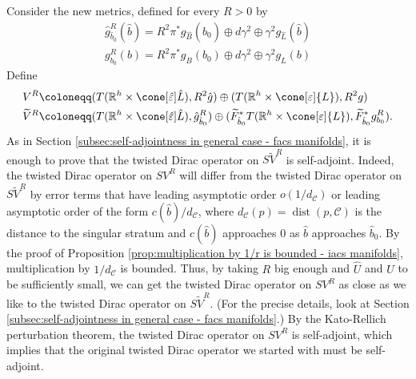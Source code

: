 \documentclass[12pt, reqno]{amsart}
\theoremstyle{plain} %
\theoremstyle{definition}
\theoremstyle{remark}
\numberwithin{equation}{section}
\newcommand{\dom}[1]{\hat{#1}}
\newcommand{\cat}[1]{\mathcal{#1}}
\newcommand{\field}[1]{\mathbb{#1}}
\newcommand{\R}{\field{R}}
\newcommand{\hdim}{h} %
\DeclareMathOperator{\dist}{dist}
\begin{document}
Consider the new metrics, defined for every \(R > 0\) by
\begin{gather*}
    \dom{g}_{\dom{b}_0}^R(\dom{b}) = R^2 \pi^*g_{\dom{B}}(\dom{b}_0) \oplus d\gamma^2 \oplus \gamma^2 g_{\dom{L}}(\dom{b}) \\
    g_{b_0}^R(b) = R^2 \pi^*g_B(b_0) \oplus d\gamma^2 \oplus \gamma^2 g_L(b)
\end{gather*}
Define
\begin{align*}
    V^R &\coloneqq (T(\R^\hdim \times \cone[\dom{\varepsilon}]{\dom{L}}), R^2 \dom{g}) \oplus (T(\R^\hdim \times \cone[\varepsilon]{L}), R^2 g) \\
    \widetilde{V}^R &\coloneqq (T(\R^\hdim \times \cone[\dom{\varepsilon}]{\dom{L}}), \dom{g}_{\dom{b}_0}^R) \oplus (\widetilde{F}_{\dom{b}_0}^*T(\R^\hdim \times \cone[\varepsilon]{L}), \widetilde{F}_{\dom{b}_0}^*g_{b_0}^R).
\end{align*}
As in Section \ref{subsec:self-adjointness in general case - facs manifolds}, it is enough to prove that the twisted Dirac operator on \(S\widetilde{V}^R\) is self-adjoint.
Indeed, the twisted Dirac operator on \(SV^R\) will differ from the twisted Dirac operator on \(S\widetilde{V}^R\) by error terms that have leading asymptotic order \(o(1/d_\cat{C})\) or leading asymptotic order of the form \(c(\dom{b})/d_\cat{C}\), where \(d_\cat{C}(p) = \dist(p, \cat{C})\) is the distance to the singular stratum and \(c(\dom{b})\) approaches 0 as \(\dom{b}\) approaches \(\dom{b}_0\).
By the proof of Proposition \ref{prop:multiplication by 1/r is bounded - iacs manifolds}, multiplication by \(1/d_\cat{C}\) is bounded.
Thus, by taking \(R\) big enough and \(\dom{U}\) and \(U\) to be sufficiently small, we can get the twisted Dirac operator on \(SV^R\) as close as we like to the twisted Dirac operator on \(S\widetilde{V}^R\).
(For the precise details, look at Section \ref{subsec:self-adjointness in general case - facs manifolds}.)
By the Kato-Rellich perturbation theorem, the twisted Dirac operator on \(SV^R\) is self-adjoint, which implies that the original twisted Dirac operator we started with must be self-adjoint.
\end{document}
